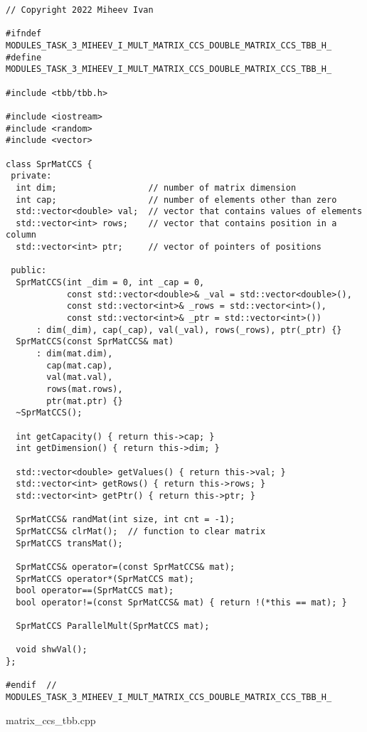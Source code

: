 \documentclass{report}
\begin{document}
\begin{lstlisting}
// Copyright 2022 Miheev Ivan

#ifndef MODULES_TASK_3_MIHEEV_I_MULT_MATRIX_CCS_DOUBLE_MATRIX_CCS_TBB_H_
#define MODULES_TASK_3_MIHEEV_I_MULT_MATRIX_CCS_DOUBLE_MATRIX_CCS_TBB_H_

#include <tbb/tbb.h>

#include <iostream>
#include <random>
#include <vector>

class SprMatCCS {
 private:
  int dim;                  // number of matrix dimension
  int cap;                  // number of elements other than zero
  std::vector<double> val;  // vector that contains values of elements
  std::vector<int> rows;    // vector that contains position in a column
  std::vector<int> ptr;     // vector of pointers of positions

 public:
  SprMatCCS(int _dim = 0, int _cap = 0,
            const std::vector<double>& _val = std::vector<double>(),
            const std::vector<int>& _rows = std::vector<int>(),
            const std::vector<int>& _ptr = std::vector<int>())
      : dim(_dim), cap(_cap), val(_val), rows(_rows), ptr(_ptr) {}
  SprMatCCS(const SprMatCCS& mat)
      : dim(mat.dim),
        cap(mat.cap),
        val(mat.val),
        rows(mat.rows),
        ptr(mat.ptr) {}
  ~SprMatCCS();

  int getCapacity() { return this->cap; }
  int getDimension() { return this->dim; }

  std::vector<double> getValues() { return this->val; }
  std::vector<int> getRows() { return this->rows; }
  std::vector<int> getPtr() { return this->ptr; }

  SprMatCCS& randMat(int size, int cnt = -1);
  SprMatCCS& clrMat();  // function to clear matrix
  SprMatCCS transMat();

  SprMatCCS& operator=(const SprMatCCS& mat);
  SprMatCCS operator*(SprMatCCS mat);
  bool operator==(SprMatCCS mat);
  bool operator!=(const SprMatCCS& mat) { return !(*this == mat); }

  SprMatCCS ParallelMult(SprMatCCS mat);

  void shwVal();
};

#endif  // MODULES_TASK_3_MIHEEV_I_MULT_MATRIX_CCS_DOUBLE_MATRIX_CCS_TBB_H_
\end{lstlisting}

\newline matrix\_ccs\_tbb.cpp
\end{document}
